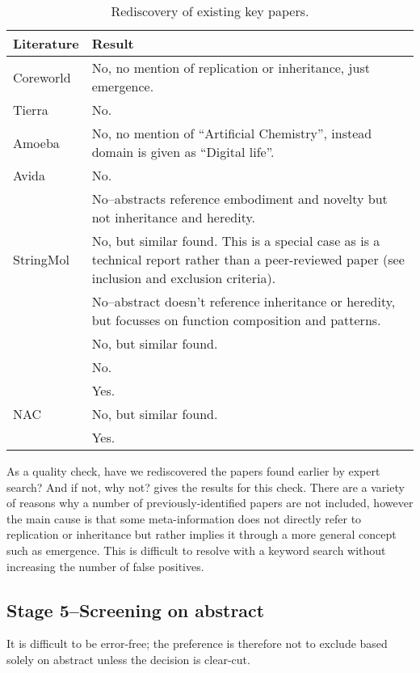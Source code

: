 \begin{table*}
\footnotesize
\begin{center}
\begin{tabular}{@{}lp{6cm}@{}}
\toprule	
Literature & Result \\
\midrule
Coreworld \cite{Rasmussen1990} & No, no mention of replication or inheritance, just emergence.\\
Tierra \cite{Ray1991} & No.\\
Amoeba \cite{Pargellis2001} & No, no mention of ``Artificial Chemistry'', instead domain is given as ``Digital life''.\\
Avida \cite{Ofria2004} & No.\\
\cite{Nellis2012,Nellis2014} & No--abstracts reference embodiment and novelty but not inheritance and heredity.\\
StringMol \cite{Hickinbotham2012} & No, but similar found. This is a special case as  \cite{Hickinbotham2012} is a technical report rather than a peer-reviewed paper (see inclusion and exclusion criteria).\\
\cite{Fontana1992}	& No--abstract doesn't reference inheritance or heredity, but focusses on function composition and patterns.\\
\cite{Dittrich1998}	& No, but similar found.	\\
\cite{Nowostawski2005} & No.\\
\cite{Fenizio2000}\cite{Fenizio2001} & Yes.	\\		
NAC \cite{Suzuki2006}    & No, but similar found.\\
\cite{Gardiner2007}  & Yes.\\
\bottomrule
\end{tabular}
\end{center}
\caption{Rediscovery of existing key papers.}\label{map-existing}
\end{table*}

As a quality check, have we rediscovered the papers found earlier by expert search? And if not, why not?  gives the results for this check. There are a variety of reasons why a number of previously-identified papers are not included, however the main cause is that some meta-information does not directly refer to replication or inheritance but rather implies it through a more general concept such as emergence. This is difficult to resolve with a keyword search without increasing the number of false positives.

\subsection{Stage 5--Screening on abstract}
It is difficult to be error-free; the preference is therefore not to exclude based solely on abstract unless the decision is clear-cut.

